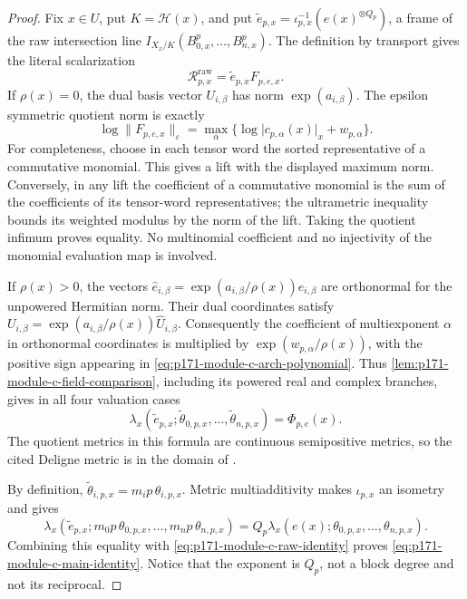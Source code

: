 \begin{proof}
Fix \(x\in U\), put \(K=\mathcal H(x)\), and put
\(\widetilde e_{p,x}=\iota_{p,x}^{-1}(e(x)^{\otimes Q_p})\), a frame of
the raw intersection line
\(I_{X_x/K}(B_{0,x}^p,\ldots,B_{n,x}^p)\).  The definition by transport
gives the literal scalarization
\[
 \mathcal R_{p,x}^{\mathrm{raw}}
 =\widetilde e_{p,x}F_{p,e,x}.
\]
If \(\rho(x)=0\), the dual basis
vector \(U_{i,\beta}\) has norm \(\exp(a_{i,\beta})\).  The epsilon
symmetric quotient norm is exactly
\begin{equation}
 \log\lVert F_{p,e,x}\rVert_\varepsilon
 =\max_\alpha\{\log\lvert c_{p,\alpha}(x)\rvert_x+w_{p,\alpha}\}.
 \label{eq:p171-module-c-exact-gauss}
\end{equation}
For completeness, choose in each tensor word the sorted representative of a
commutative monomial.  This gives a lift with the displayed maximum norm.
Conversely, in any lift the coefficient of a commutative monomial is the
sum of the coefficients of its tensor-word representatives; the
ultrametric inequality bounds its weighted modulus by the norm of the
lift.  Taking the quotient infimum proves equality.  No multinomial
coefficient and no injectivity of the monomial evaluation map is involved.

If \(\rho(x)>0\), the vectors
\(\widehat e_{i,\beta}=\exp(a_{i,\beta}/\rho(x))e_{i,\beta}\)
are orthonormal for the unpowered Hermitian norm.  Their dual coordinates
satisfy
\(U_{i,\beta}=\exp(a_{i,\beta}/\rho(x))\widehat U_{i,\beta}\).
Consequently the coefficient of multiexponent \(\alpha\) in orthonormal
coordinates is multiplied by
\(\exp(w_{p,\alpha}/\rho(x))\), with the positive sign appearing in
\eqref{eq:p171-module-c-arch-polynomial}.  Thus
\cref{lem:p171-module-c-field-comparison}, including its powered real and
complex branches, gives in all four valuation cases
\begin{equation}
 \lambda_x\!\left(\widetilde e_{p,x};
       \widetilde\theta_{0,p,x},\ldots,
       \widetilde\theta_{n,p,x}\right)=\Phi_{p,e}(x).
 \label{eq:p171-module-c-raw-identity}
\end{equation}
The quotient metrics in this formula are continuous semipositive metrics,
so the cited Deligne metric is in the domain of
\cite[Theorem~8.16]{BE21}.

By definition,
\(\widetilde\theta_{i,p,x}=m_ip\,\theta_{i,p,x}\).  Metric
multiadditivity makes \(\iota_{p,x}\) an isometry and gives
\[
 \lambda_x\!\left(\widetilde e_{p,x};
       m_0p\,\theta_{0,p,x},\ldots,m_np\,\theta_{n,p,x}\right)
 =Q_p\lambda_x(e(x);\theta_{0,p,x},\ldots,\theta_{n,p,x}).
\]
Combining this equality with \eqref{eq:p171-module-c-raw-identity} proves
\eqref{eq:p171-module-c-main-identity}.  Notice that the exponent is
\(Q_p\), not a block degree and not its reciprocal.


\end{proof}
